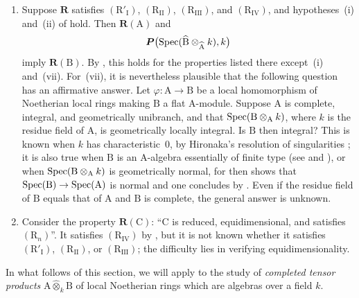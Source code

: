 \begin{remarks}[7.5.4]
\begin{enumerate}[label=(\roman*)]
  \item Suppose $\boldsymbol{R}$ satisfies $(\mathrm{R}'_{\mathrm{I}})$, $(\mathrm{R}_{\mathrm{II}})$, $(\mathrm{R}_{\mathrm{III}})$, and $(\mathrm{R}_{\mathrm{IV}})$, and hypotheses~(i) and~(ii) of  hold. Then $\boldsymbol{R}(\mathrm{A})$ and
  \[
    \boldsymbol{P}\bigl(\operatorname{Spec}(\widehat{\mathrm{B}}\otimes_{\widehat{\mathrm{A}}}k),k\bigr)
  \]
  imply $\boldsymbol{R}(\mathrm{B})$. By , this holds for the properties listed there except~(i) and~(vii). For~(vii), it is nevertheless plausible that the following question has an affirmative answer. Let $\varphi:\mathrm{A}\to\mathrm{B}$ be a local homomorphism of Noetherian local rings making $\mathrm{B}$ a flat $\mathrm{A}$-module. Suppose $\mathrm{A}$ is complete, integral, and geometrically unibranch, and that $\operatorname{Spec}(\mathrm{B}\otimes_\mathrm{A}k)$, where $k$ is the residue field of $\mathrm{A}$, is geometrically locally integral. Is $\mathrm{B}$ then integral? This is known when $k$ has characteristic~$0$, by Hironaka's resolution of singularities ; it is also true when $\mathrm{B}$ is an $\mathrm{A}$-algebra essentially of finite type  (see  and ), or when $\operatorname{Spec}(\mathrm{B}\otimes_\mathrm{A}k)$ is geometrically normal, for then  shows that $\operatorname{Spec}(\mathrm{B})\to\operatorname{Spec}(\mathrm{A})$ is normal and one concludes by . Even if the residue field of $\mathrm{B}$ equals that of $\mathrm{A}$ and $\mathrm{B}$ is complete, the general answer is unknown.

  \item Consider the property $\boldsymbol{R}(\mathrm{C})$: ``$\mathrm{C}$ is reduced, equidimensional, and satisfies $(\mathrm{R}_n)$''. It satisfies $(\mathrm{R}_{\mathrm{IV}})$ by , but it is not known whether it satisfies $(\mathrm{R}'_{\mathrm{I}})$, $(\mathrm{R}_{\mathrm{II}})$, or $(\mathrm{R}_{\mathrm{III}})$; the difficulty lies in verifying equidimensionality.
\end{enumerate}
\end{remarks}


In what follows of this section, we will apply  to the study of \emph{completed tensor products} $\mathrm{A}\widehat{\otimes}_k\mathrm{B}$ of local Noetherian rings which are algebras over a field $k$.

